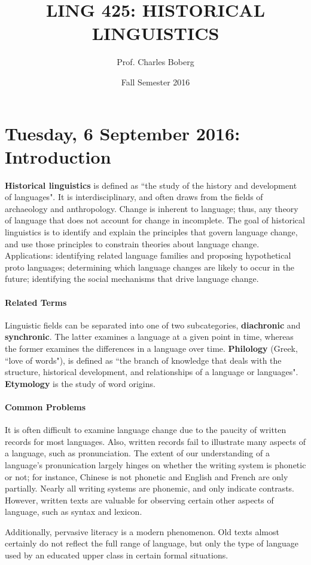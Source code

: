 \documentclass{exam}
\title{LING 425: HISTORICAL LINGUISTICS}
\date{Fall Semester 2016}
\author{Prof. Charles Boberg}
\begin{document}
\pagestyle{fancy}
\fancyhf{}

\maketitle



\section*{Tuesday, 6 September 2016: Introduction}

\noindent \textbf{Historical linguistics} is defined as ``the study of the history and development of languages". 
It is interdisciplinary, and often draws from the fields of archaeology and anthropology.
Change is inherent to language; thus, any theory of language that does not account for change in incomplete. 
The goal of historical linguistics is to identify and explain the principles that govern language change, and use those principles to constrain theories about language change. 
Applications: identifying related language families and proposing hypothetical proto languages; determining which language changes are likely to occur in the future; identifying the social mechanisms that drive language change.
\fancyfoot[C]{\thepage}


\paragraph{Related Terms} Linguistic fields can be separated into one of two subcategories, \textbf{diachronic} and \textbf{synchronic}. 
The latter examines a language at a given point in time, whereas the former examines the differences in a language over time.
\textbf{Philology} (Greek, ``love of words"), is defined as ``the branch of knowledge that deals with the structure, historical development, and relationships of a language or languages". 
\textbf{Etymology} is the study of word origins. \par
 

\paragraph{Common Problems} It is often difficult to examine language change due to the paucity of written records for most languages. 
Also, written records fail to illustrate many aspects of a language, such as pronunciation. 
The extent of our understanding of a language's pronunication largely hinges on whether the writing system is phonetic or not; for instance, Chinese is not phonetic and English and French are only partially. 
Nearly all writing systems are phonemic, and only indicate contrasts. 
However, written texts are valuable for observing certain other aspects of language, such as syntax and lexicon. 
\par Additionally, pervasive literacy is a modern phenomenon. 
Old texts almost certainly do not reflect the full range of language, but only the type of language used by an educated upper class in certain formal situations. 
\end{document}
